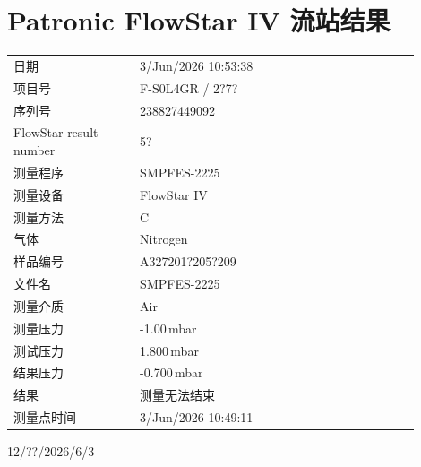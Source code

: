 \documentclass[UTF8,10pt,a4paper,fontset=fandol]{ctexart}
\newcommand{\fieldvalue}[1]{#1}
\newcommand{\handwritten}[1]{#1}
\begin{document}
\newpage

\section{Patronic FlowStar IV 流站结果}

\begin{tabular}{@{}p{0.28\linewidth}p{0.62\linewidth}@{}}
日期 &
\fieldvalue{3/Jun/2026 10:53:38}
\\
项目号 &
\fieldvalue{F-S0L4GR / 2?7?}
\\
序列号 &
\fieldvalue{238827449092}
\\
FlowStar result number &
\fieldvalue{5?}
\\
测量程序 &
\fieldvalue{SMPFES-2225}
\\
测量设备 &
\fieldvalue{FlowStar IV}
\\
测量方法 &
\fieldvalue{C}
\\
气体 &
\fieldvalue{Nitrogen}
\\
样品编号 &
\fieldvalue{A327201?205?209}
\\
文件名 &
\fieldvalue{SMPFES-2225}
\\
测量介质 &
\fieldvalue{Air}
\\
测量压力 &
\fieldvalue{-1.00\,mbar}
\\
测试压力 &
\fieldvalue{1.800\,mbar}
\\
结果压力 &
\fieldvalue{-0.700\,mbar}
\\
结果 &
\fieldvalue{测量无法结束}
\\
测量点时间 &
\fieldvalue{3/Jun/2026 10:49:11}
\end{tabular}

\handwritten{12/??/2026/6/3}
\end{document}
